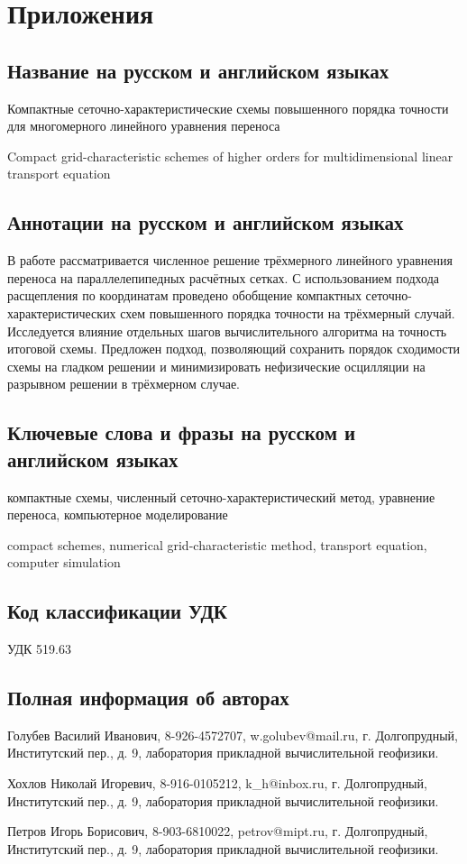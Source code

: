 \documentclass[11pt]{article}
\begin{document}

\section {Приложения}

\subsection {Название на русском и английском языках}

Компактные сеточно-характеристические схемы повышенного порядка точности для многомерного линейного уравнения переноса

Compact grid-characteristic schemes of higher orders for multidimensional linear transport equation

\subsection {Аннотации на русском и английском языках}
В работе рассматривается численное решение трёхмерного линейного уравнения переноса на параллелепипедных расчётных сетках.
С использованием подхода расщепления по координатам проведено обобщение компактных сеточно-характеристических схем повышенного порядка точности на трёхмерный случай.
Исследуется влияние отдельных шагов вычислительного алгоритма на точность итоговой схемы.
Предложен подход, позволяющий сохранить порядок сходимости схемы на гладком решении и минимизировать нефизические осцилляции на разрывном решении в трёхмерном случае.


\subsection {Ключевые слова и фразы на русском и английском языках}

компактные схемы, численный сеточно-характеристический метод, уравнение переноса, компьютерное моделирование

compact schemes, numerical grid-characteristic method, transport equation, computer simulation

\subsection {Код классификации УДК}

УДК 519.63

\subsection {Полная информация об авторах}

Голубев Василий Иванович, 8-926-4572707, w.golubev@mail.ru, г. Долгопрудный, Институтский пер., д. 9, лаборатория прикладной вычислительной геофизики.

Хохлов Николай Игоревич, 8-916-0105212, k\_h@inbox.ru, г. Долгопрудный, Институтский пер., д. 9, лаборатория прикладной вычислительной геофизики.

Петров Игорь Борисович, 8-903-6810022, petrov@mipt.ru, г. Долгопрудный, Институтский пер., д. 9, лаборатория прикладной вычислительной геофизики.

\fi
\end{document}
